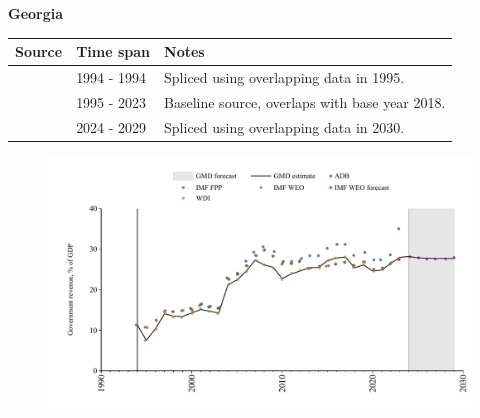 \documentclass[12pt,a4paper,landscape]{article}
\begin{document}
\begin{adjustbox}{max totalsize={\paperwidth}{\paperheight},center}
\begin{minipage}[t][\textheight][t]{\textwidth}
\vspace*{0.5cm}
{}
\begin{center}
{\Large\bfseries Georgia}
\end{center}
\vspace{0.5cm}
\begin{table}[H]
\centering
\small
\begin{tabular}{|l|l|l|}
\hline
\textbf{Source} & \textbf{Time span} & \textbf{Notes} \\
\hline
\rowcolor{white}\cite{IMF_WEO}& 1994 - 1994 &Spliced using overlapping data in 1995.\\
\rowcolor{lightgray}\cite{WDI}& 1995 - 2023 &Baseline source, overlaps with base year 2018.\\
\rowcolor{white}\cite{IMF_WEO_forecast}& 2024 - 2029 &Spliced using overlapping data in 2030.\\
\hline
\end{tabular}
\end{table}
\begin{figure}[H]
\centering
\includegraphics[width=\textwidth,height=0.6\textheight,keepaspectratio]{graphs/GEO_govrev_GDP.pdf}
\end{figure}
\end{minipage}
\end{adjustbox}
\end{document}
